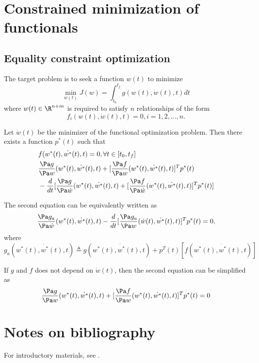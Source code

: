 \begin{refsection}
\section{Constrained minimization of functionals}
\subsection{Equality constraint optimization}
\begin{definition}
The target problem is to seek a function $w(t)$ to minimize
$$\min_{w(t)} J(w) = \int_{t_0}^{t_f} g(w(t),\dot{w}(t),t)dt$$	
where $w(t)\in\R^{n+m}$ is required to satisfy $n$ relationships of the form
$$f_i(w(t),\dot{w}(t),t) = 0, i = 1,2,...,n.$$
\end{definition}

\begin{lemma}\cite[171]{kirk2012optimal}\label{ch:calculus-of-variations:th:firstOrderNecessaryConditionEqualityConstraint}
Let $\dot{w}(t)$ be the minimizer of the functional optimization problem. Then there exists a function $p^*(t)$ such that 	
	\begin{align*}
	&f(w^*(t),\dot{w^*}(t),t) = 0, \forall t\in [t_0,t_f]\\
	&\frac{\Pa g}{\Pa w}(w^*(t),\dot{w^*}(t),t) + [\frac{\Pa f}{\Pa w}(w^*(t),\dot{w^*}(t),t)]^Tp^*(t) \\
	& - \frac{d}{dt}[\frac{\Pa g}{\Pa \dot{w}}(w^*(t),\dot{w^*}(t),t) + [\frac{\Pa f}{\Pa \dot{w}}(w^*(t),\dot{w^*}(t),t)]^Tp^*(t)]  
	\end{align*}

The second equation can be equivalently written as
$$\frac{\Pa g_a}{\Pa \dot{w}}(w^*(t),\dot{w^*}(t),t) -\frac{d}{dt}[\frac{\Pa g_a}{\Pa w}(\dot{w}(t),\dot{w^*}(t),t)]^Tp^*(t) = 0,$$
where
$$g_a(w^*(t),\dot{w^*}(t),t) \triangleq g(w^*(t),\dot{w^*}(t),t) + p^T(t)[f(w^*(t),\dot{w^*}(t),t)]$$
\end{lemma}

 
\begin{remark}
If $g$ and $f$ does not depend on $\dot{w}(t)$, then the second equation can be simplified as
$$\frac{\Pa g}{\Pa w}(w^*(t),\dot{w^*}(t),t) + [\frac{\Pa f}{\Pa w}(w^*(t),\dot{w^*}(t),t)]^Tp^*(t) = 0 
$$	
\end{remark} 
 
\section{Notes on bibliography}
For introductory materials, see \cite{luenberger1969optimization}\cite{kirk2012optimal}.


\printbibliography
\end{refsection}
